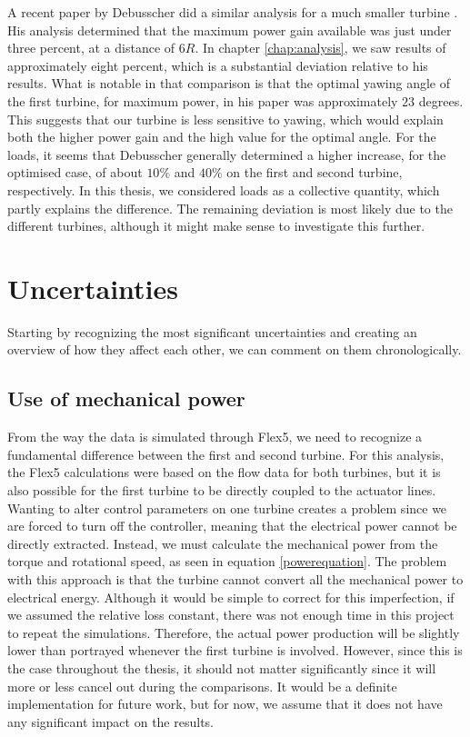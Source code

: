A recent paper by Debusscher \cite{charles} did a similar analysis for a much smaller turbine \cite{smallturbine}. His analysis determined that the maximum power gain available was just under three percent, at a distance of $6R$. In chapter \ref{chap:analysis}, we saw results of approximately eight percent, which is a substantial deviation relative to his results. What is notable in that comparison is that the optimal yawing angle of the first turbine, for maximum power, in his paper was approximately $23$ degrees. This suggests that our turbine \cite{turbineref} is less sensitive to yawing, which would explain both the higher power gain and the high value for the optimal angle. For the loads, it seems that Debusscher \cite{charles} generally determined a higher increase, for the optimised case, of about $10\%$ and $40\%$ on the first and second turbine, respectively. In this thesis, we considered loads as a collective quantity, which partly explains the difference. The remaining deviation is most likely due to the different turbines, although it might make sense to investigate this further.

\section{Uncertainties}

Starting by recognizing the most significant uncertainties and creating an overview of how they affect each other, we can comment on them chronologically.

\subsection{Use of mechanical power}

From the way the data is simulated through Flex5, we need to recognize a fundamental difference between the first and second turbine. For this analysis, the Flex5 calculations were based on the flow data for both turbines, but it is also possible for the first turbine to be directly coupled to the actuator lines. Wanting to alter control parameters on one turbine creates a problem since we are forced to turn off the controller, meaning that the electrical power cannot be directly extracted. Instead, we must calculate the mechanical power from the torque and rotational speed, as seen in equation \ref{powerequation}. The problem with this approach is that the turbine cannot convert all the mechanical power to electrical energy. Although it would be simple to correct for this imperfection, if we assumed the relative loss constant, there was not enough time in this project to repeat the simulations. Therefore, the actual power production will be slightly lower than portrayed whenever the first turbine is involved. However, since this is the case throughout the thesis, it should not matter significantly since it will more or less cancel out during the comparisons. It would be a definite implementation for future work, but for now, we assume that it does not have any significant impact on the results.

